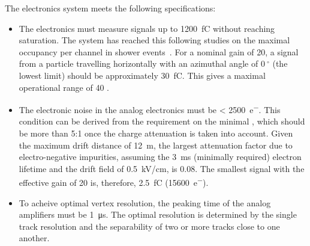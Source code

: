 The%
 electronics system meets the following specifications: %
\begin{itemize}
\item{The  electronics must measure signals up to \SI{1200}{\femto\coulomb} without reaching saturation. The system has reached this following  studies on the maximal occupancy per channel in shower events~\cite{WA105-TDR}. For a nominal  gain of \num{20}, a  signal from a particle travelling horizontally with an azimuthal angle of $\SI{0}{^\circ}$ (the lowest limit) should be approximately \SI{30}{fC}. This gives  a maximal operational range of \num{40} .}

\item{The electronic noise in the  analog electronics must be \SI{< 2500}{e^{-}}. This condition can be derived from the requirement on the minimal , which should be more than \num{5}:\num{1} once the charge attenuation is taken into account. Given the maximum drift distance of \SI{12}{\meter}, the largest attenuation factor due to electro-negative impurities, assuming the \SI{3}{\milli\second} (minimally required) electron lifetime and the drift field of \SI{0.5}{\kilo\volt/\cm}, is \num{0.08}. The smallest  signal with the  effective gain of \num{20} is, therefore, \SI{2.5}{\femto\coulomb} (\SI{15600}{e^{-}}).}


\item{To acheive optimal vertex resolution, the peaking time of the  analog amplifiers must be \SI{1}{\micro\second}. The optimal resolution is determined by the single track resolution and the separability of two or more tracks close to one another.}


\end{itemize}
